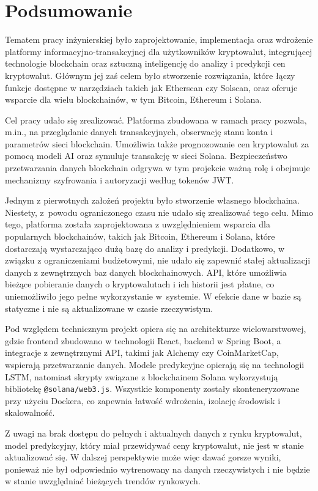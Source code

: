 \chapter{Podsumowanie}
Tematem pracy inżynierskiej było zaprojektowanie, implementacja oraz wdrożenie platformy informacyjno-transakcyjnej dla użytkowników kryptowalut, integrującej technologie blockchain oraz sztuczną inteligencję do analizy i predykcji cen kryptowalut. Głównym jej zaś celem było stworzenie rozwiązania, które łączy funkcje dostępne w narzędziach takich jak Etherscan czy Solscan, oraz oferuje wsparcie dla wielu blockchainów, w tym Bitcoin, Ethereum i Solana. 

Cel pracy udało się zrealizować. Platforma zbudowana w ramach pracy pozwala, m.in., na przeglądanie danych transakcyjnych, obserwację stanu konta i parametrów sieci blockchain. Umożliwia także prognozowanie cen kryptowalut za pomocą modeli AI oraz symuluje transakcję w sieci Solana. Bezpieczeństwo przetwarzania danych blockchain odgrywa w tym projekcie ważną rolę i obejmuje mechanizmy szyfrowania i autoryzacji według tokenów JWT.

Jednym z pierwotnych założeń projektu było stworzenie własnego blockchaina. Niestety, z~powodu ograniczonego czasu nie udało się zrealizować tego celu. Mimo tego, platforma została zaprojektowana z uwzględnieniem wsparcia dla popularnych blockchainów, takich jak Bitcoin, Ethereum i Solana, które dostarczają wystarczająco dużą bazę do analizy i predykcji. Dodatkowo, w związku z ograniczeniami budżetowymi, nie udało się zapewnić stałej aktualizacji danych z zewnętrznych baz danych blockchainowych. API, które umożliwia bieżące pobieranie danych o kryptowalutach i ich historii jest płatne, co uniemożliwiło jego pełne wykorzystanie w~systemie. W efekcie dane w bazie są statyczne i nie są aktualizowane w czasie rzeczywistym.

Pod względem technicznym projekt opiera się na architekturze wielowarstwowej, gdzie frontend zbudowano w technologii React, backend w Spring Boot, a integracje z zewnętrznymi API, takimi jak Alchemy czy CoinMarketCap, wspierają przetwarzanie danych. Modele predykcyjne opierają się na technologii LSTM, natomiast skrypty związane z blockchainem Solana wykorzystują bibliotekę \texttt{@solana/web3.js}. Wszystkie komponenty zostały skonteneryzowane przy użyciu Dockera, co zapewnia łatwość wdrożenia, izolację środowisk i skalowalność. 

Z uwagi na brak dostępu do pełnych i aktualnych danych z rynku kryptowalut, model predykcyjny, który miał przewidywać ceny kryptowalut, nie jest w stanie aktualizować się. W dalszej perspektywie może więc dawać gorsze wyniki, ponieważ nie był odpowiednio wytrenowany na danych rzeczywistych i nie będzie w stanie uwzględniać bieżących trendów rynkowych.

